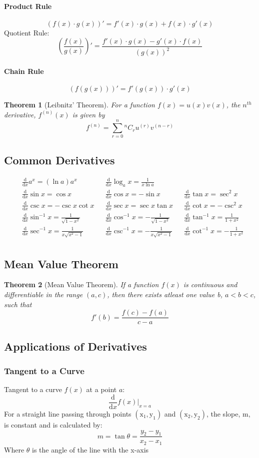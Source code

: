 \documentclass[12pt]{article}
\newcommand{\diff}[1]{\frac{\mathrm{d}}{\mathrm{d}#1}}
\newtheorem{thrm}{Theorem}
\begin{document}
\paragraph{Product Rule}
$$(f(x)\cdot g(x))' = f'(x)\cdot g(x) + f(x)\cdot g'(x)$$
Quotient Rule:
$$\left(\frac{f(x)}{g(x)}\right)' = \frac{f'(x)\cdot g(x) - g'(x)\cdot f(x)}{(g(x))^2}$$
\paragraph{Chain Rule}
$$ (f(g(x)))' = f'(g(x))\cdot g'(x)$$
\begin{thrm}[Leibnitz' Theorem]
	For a function $f(x) = u(x)v(x)$, the ${n^{th}}$ derivative, $f^{(n)}(x)$ is given by
	$$f^{(n)}= \sum_{r=0}^{n}{^nC_r u^{(r)}v^{(n-r)}}$$
\end{thrm}
\subsection{Common Derivatives}
\begin{align*}
&\diff{x}a^x = (\ln a)a^x & &\diff{x}\log_a x = \frac{1}{x\ln a} \\
&\diff{x}\sin x = \cos x & &\diff{x}\cos x = -\sin x & &\diff{x}\tan x = \sec^2 x\\
&\diff{x}\csc x = -\csc x \cot x & &\diff{x}\sec x = \sec x \tan x & &\diff{x}\cot x = -\csc^2 x \\
&\diff{x}\sin^{-1}x = \frac{1}{\sqrt{1 - x^2}} & &\diff{x}\cos^{-1}x = - \frac{1}{\sqrt{1 - x^2}} & &\diff{x}\tan^{-1}x = \frac{1}{1 + x^2} \\
&\diff{x}\sec^{-1}x = \frac{1}{ x \sqrt{x^2 - 1}} &  &\diff{x}\csc^{-1}x = -\frac{1}{ x \sqrt{x^2 - 1}} & &\diff{x}\cot^{-1}x = -\frac{1}{1 + x^2} \\
\end{align*}
\subsection{Mean Value Theorem}
\begin{thrm}[Mean Value Theorem]
	If a function $f(x)$ is continuous and differentiable in the range $(a,c)$, then there exists atleast one value b, $a < b < c$, such that
	$$f'(b) = \frac{f(c) - f(a)}{c - a}$$
\end{thrm}
\subsection{Applications of Derivatives}
\subsubsection{Tangent to a Curve}
Tangent to a curve $f(x)$ at a point $a$:
$$\diff{x}f(x)\Big\rvert_{x=a}$$
For a straight line passing through points $\mathrm{(x_1,y_1)}$ and  $\mathrm{(x_2, y_2)}$, the slope, m, is constant and is calculated by:
$$m = \tan\theta = \frac{y_2 - y_1}{x_2 - x_1}$$
Where $\theta$ is the angle of the line with the x-axis
\end{document}
